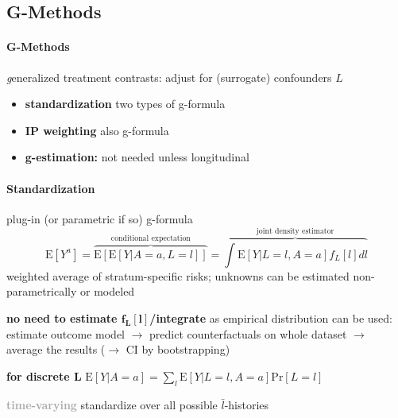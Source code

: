 \documentclass[8pt]{extarticle}
\begin{document}
\subsection{G-Methods}
\begin{multicols}{2}


\paragraph{\large G-Methods} \textit{g}eneralized treatment contrasts:
adjust for (surrogate) confounders $L$




\begin{itemize}[itemsep=0em, topsep=0pt, partopsep=0pt,parsep=0pt]
\setlength{\itemsep}{0pt}%
\setlength{\parskip}{0pt}
\item \textbf{standardization} two types of g-formula
\item \textbf{IP weighting} also g-formula
\item \textbf{g-estimation:} not needed unless longitudinal
\end{itemize}

\paragraph{\large Standardization} plug-in (or parametric if so) g-formula
$$\mathrm{E}\left[Y^{a}\right] = \overbrace{\mathrm{E}\left[\mathrm{E}\left[Y|A{=}a,L{=}l\right]\right]}^{\text{conditional expectation}} =  \overbrace{ \textstyle{\int} \mathrm{E}\left[Y|L=l, A=a\right]f_L\left[l\right]dl}^{\text{joint density estimator}} $$
weighted average of stratum-specific risks; unknowns can be estimated non-parametrically or modeled

\noindent \textbf{no need to estimate $\boldsymbol{f_L\left[l\right]}$/integrate} as empirical distribution can be used: estimate outcome model $\rightarrow$ predict counterfactuals on whole dataset $\rightarrow$ average the results ($\rightarrow$ CI by bootstrapping)

\noindent \textbf{for discrete $\boldsymbol{ L}$}  $\mathrm{E}\left[Y|A=a\right] = \sum_l \mathrm{E}\left[Y|L=l, A=a\right]\mathrm{Pr}\left[L=l\right]$

\vspace{0.2em}
\noindent \colorbox{lightgray!20!white}{\begin{minipage}{28em}




\textbf{\textcolor{darkgray}{time-varying}} standardize over all possible $\bar{l}$-histories




\end{minipage}}
\end{multicols}
\end{document}
